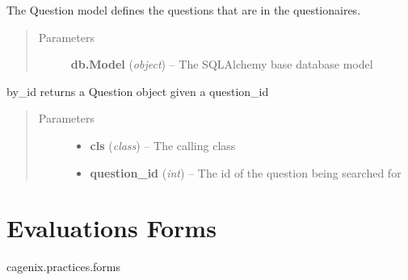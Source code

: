 \documentclass[letterpaper,10pt,english]{sphinxmanual}
\begin{document}

\begin{fulllineitems}
\label{dev-evaluations:cagenix.evaluations.models.Question}
The Question model defines the questions that are in the questionaires.
\begin{quote}\begin{description}
\item[{Parameters}] \leavevmode
\textbf{db.Model} (\emph{object}) -- The SQLAlchemy base database model

\end{description}\end{quote}

\begin{fulllineitems}
\label{dev-evaluations:cagenix.evaluations.models.Question.by_id}
by\_id returns a Question object given a question\_id
\begin{quote}\begin{description}
\item[{Parameters}] \leavevmode\begin{itemize}
\item {} 
\textbf{cls} (\emph{class}) -- The calling class

\item {} 
\textbf{question\_id} (\emph{int}) -- The id of the question being searched for

\end{itemize}

\end{description}\end{quote}

\end{fulllineitems}


\end{fulllineitems}



\section{Evaluations Forms}
\label{dev-evaluations:module-cagenix.evaluations.forms}\label{dev-evaluations:evaluations-forms-label}\label{dev-evaluations:evaluations-forms}
cagenix.practices.forms
\end{document}
